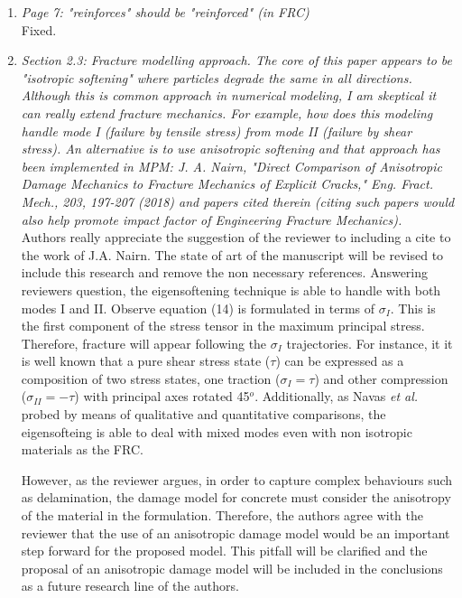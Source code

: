 \documentclass[12pt]{article}
\begin{document}
\begin{enumerate}
\item \textit{Page 7: "reinforces" should be "reinforced" (in FRC)}\\

Fixed.

\item \textit{Section 2.3: Fracture modelling approach. The core of this paper appears to be "isotropic softening" where particles degrade the same in all directions. Although this is common approach in numerical modeling, I am skeptical it can really extend fracture mechanics. For example, how does this modeling handle mode I (failure by tensile stress) from mode II (failure by shear stress). An alternative is to use anisotropic softening and that approach has been implemented in MPM: J. A. Nairn, "Direct Comparison of Anisotropic Damage Mechanics to Fracture Mechanics of Explicit Cracks," Eng. Fract. Mech., 203, 197-207 (2018) and papers cited therein (citing such papers would also help promote impact factor of Engineering Fracture Mechanics).}\\
 
Authors really appreciate the suggestion of the reviewer to including a cite to the work of J.A. Nairn. The state of art of the manuscript will be revised to include this research and remove the non necessary references. Answering reviewer\textquotesingle s question, the eigensoftening technique is able to handle with both modes I and II. Observe equation (14) is formulated in terms of $\sigma_{I}$. This is the first component of the stress tensor in the maximum principal stress. Therefore, fracture will appear following the $\sigma_I$ trajectories. For instance, it it is well known that a pure shear stress state ($\tau$) can be expressed as a composition of two stress states, one traction ($\sigma_{I} = \tau$) and other compression ($\sigma_{II} = -  \tau$) with principal axes rotated 45$^o$. Additionally, as  Navas {\it et al.}  \cite{Navas_2018b} probed by means of qualitative and quantitative comparisons, the eigensofteing is able to deal with mixed modes even with non isotropic materials as the FRC.

However, as the reviewer argues, in order to capture complex behaviours such as delamination, the damage model for concrete must consider the anisotropy of the material in the formulation. Therefore, the authors agree with the reviewer that the use of an anisotropic damage model would be an important step forward for the proposed model. This pitfall will be clarified and the proposal of an anisotropic damage model will be included in the conclusions as a future research line of the authors.
 

\end{enumerate}
\end{document}
